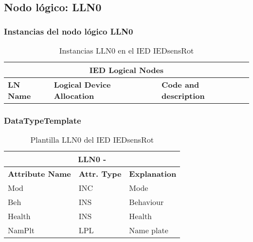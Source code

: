 
\subsection{Nodo l\'ogico: 			 LLN0}

    \subsubsection{Instancias del nodo l\'ogico LLN0}
    \begin{table}[H]
    \begin{center}
    \begin{tabular}{|l|l|p{6.8cm}|}
            \hline
            \multicolumn{3}{|c|}{\cellcolor[gray]{0.8} \textbf{IED Logical Nodes} } \\
            \hline
            \textbf{LN Name} & \textbf{Logical Device Allocation} & \textbf{Code and description} \\
            \hline
    \end{tabular}
    \caption{Instancias LLN0 en el IED IEDsensRot}
    \label{table:lnInstLLN0_1}
    \end{center}
    \end{table}
    
    
    
    \subsubsection{DataTypeTemplate}
    \begin{table}[H]
    \begin{center}
    \begin{tabular}{|l|l|p{8.5cm}|}
            \hline
            \multicolumn{3}{|c|}{\cellcolor[gray]{0.8} \textbf{ LLN0}  -  } \\
            \hline
            \textbf{Attribute Name} & \textbf{Attr. Type} & \textbf{Explanation} \\
            \hline 
            Mod & INC & Mode \\
            \hline
            Beh & INS & Behaviour \\
            \hline
            Health & INS & Health \\
            \hline
            NamPlt & LPL & Name plate \\
            \hline
    \end{tabular}
    \caption{Plantilla LLN0 del IED IEDsensRot}
    \label{table:lnTypeLLN0_1}
    \end{center}
    \end{table}
    
    
    